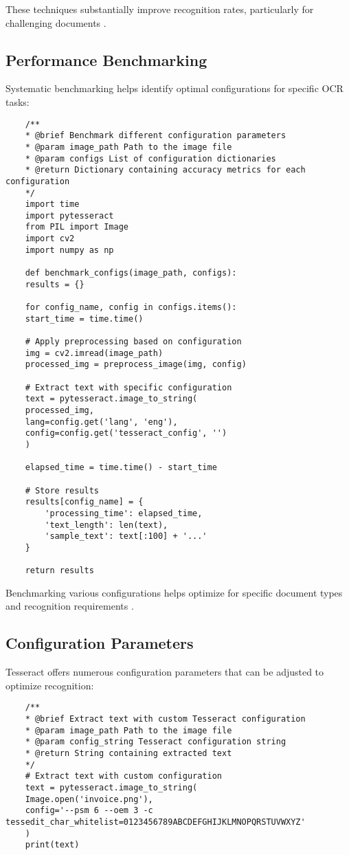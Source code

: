 These techniques substantially improve recognition rates, particularly for challenging documents \cite{GeekyAnts:2023}.

\subsection{Performance Benchmarking}
\label{subsec:benchmarking}

Systematic benchmarking helps identify optimal configurations for specific OCR tasks:

\begin{verbatim}
	/**
	* @brief Benchmark different configuration parameters
	* @param image_path Path to the image file
	* @param configs List of configuration dictionaries
	* @return Dictionary containing accuracy metrics for each configuration
	*/
	import time
	import pytesseract
	from PIL import Image
	import cv2
	import numpy as np
	
	def benchmark_configs(image_path, configs):
	results = {}
	
	for config_name, config in configs.items():
	start_time = time.time()
	
	# Apply preprocessing based on configuration
	img = cv2.imread(image_path)
	processed_img = preprocess_image(img, config)
	
	# Extract text with specific configuration
	text = pytesseract.image_to_string(
	processed_img, 
	lang=config.get('lang', 'eng'),
	config=config.get('tesseract_config', '')
	)
	
	elapsed_time = time.time() - start_time
	
	# Store results
	results[config_name] = {
		'processing_time': elapsed_time,
		'text_length': len(text),
		'sample_text': text[:100] + '...'
	}
	
	return results
\end{verbatim}

Benchmarking various configurations helps optimize for specific document types and recognition requirements \cite{Reddit:2023}.

\subsection{Configuration Parameters}
\label{subsec:configuration}

Tesseract offers numerous configuration parameters that can be adjusted to optimize recognition:

\begin{verbatim}
	/**
	* @brief Extract text with custom Tesseract configuration
	* @param image_path Path to the image file
	* @param config_string Tesseract configuration string
	* @return String containing extracted text
	*/
	# Extract text with custom configuration
	text = pytesseract.image_to_string(
	Image.open('invoice.png'),
	config='--psm 6 --oem 3 -c tessedit_char_whitelist=0123456789ABCDEFGHIJKLMNOPQRSTUVWXYZ'
	)
	print(text)
\end{verbatim}

